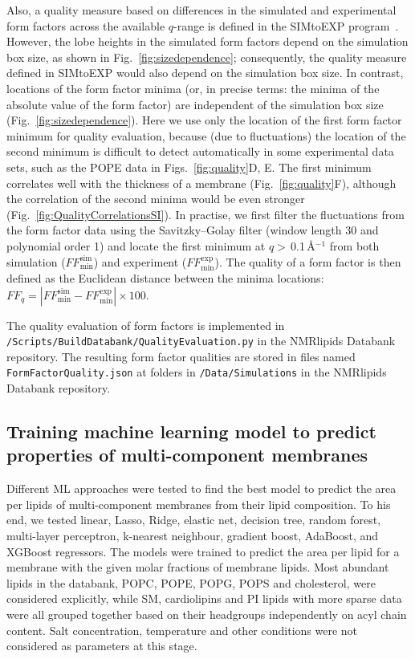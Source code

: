 \documentclass[fleqn,10pt]{wlscirep}
\begin{document}
Also, a quality measure based on differences in the simulated and experimental form factors across the available $q$-range is defined in the SIMtoEXP program~\cite{kucerka10}. However, the lobe heights in the simulated form factors depend on the simulation box size, as shown in Fig.~\ref{fig:sizedependence}; consequently, the quality measure defined in SIMtoEXP  would also depend on the simulation box size. In contrast, locations of the form factor minima (or, in precise terms: the minima of the absolute value of the form factor) are independent of the simulation box size (Fig.~\ref{fig:sizedependence}).
Here we use only the location of the first form factor minimum for quality evaluation,
because (due to fluctuations) the location of the second minimum is difficult to detect automatically in some experimental data sets, such as the POPE data in Figs.~\ref{fig:quality}D, E.
The first minimum correlates well with the thickness of a membrane (Fig.~\ref{fig:quality}F), although the correlation of the second minima would be even stronger (Fig.~\ref{fig:QualityCorrelationsSI}).
In practise, we first filter the fluctuations from the form factor data using the Savitzky--Golay filter (window length 30 and polynomial order 1) and locate the first minimum at  $q>$\,0.1\,\AA$^{-1}$ from both simulation ($F\!F_\mathrm{min}^\mathrm{sim}$) and experiment ($F\!F_\mathrm{min}^\mathrm{exp}$).
The quality of a form factor is then defined as the Euclidean distance between the minima locations: $F\!F_q = |F\!F_\mathrm{min}^\mathrm{sim}-F\!F_\mathrm{min}^\mathrm{exp}| \times 100$. 

The quality evaluation of form factors is implemented in \texttt{/Scripts/BuildDatabank/QualityEvaluation.py} in the NMRlipids Databank repository. The resulting form factor qualities are stored in files named \texttt{FormFactorQuality.json} at folders in \texttt{/Data/Simulations} in the NMRlipids Databank repository.


\subsection{Training machine learning model to predict properties of multi-component membranes}
    Different ML approaches were tested to find the best model to predict the area per lipids of multi-component membranes  from their lipid composition. To his end, we tested linear, Lasso, Ridge, elastic net, decision tree, random forest, multi-layer perceptron, k-nearest neighbour, gradient boost, AdaBoost, and XGBoost regressors. The models were trained to predict the area per lipid for a membrane with the given molar fractions of membrane lipids. Most abundant lipids in the databank, POPC, POPE, POPG, POPS and cholesterol, were considered explicitly, while SM, cardiolipins and PI lipids with  more sparse data were all grouped together based on their headgroups independently on acyl chain content. Salt concentration, temperature and other conditions were not considered as parameters at this stage. 
\end{document}
